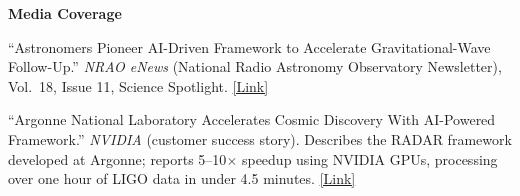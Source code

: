 \documentclass[letterpaper,11pt]{article}
\newcommand{\PubSection}[1]{%
  \vspace{6pt}\noindent\textbf{#1}\vspace{3pt}%
}
\begin{document}
\PubSection{Media Coverage}
\begin{enumerate}[leftmargin=1cm, label={[\arabic*]}, itemsep=3pt]
  \small
  \item ``Astronomers Pioneer AI-Driven Framework to Accelerate Gravitational-Wave Follow-Up.'' \textit{NRAO eNews} (National Radio Astronomy Observatory Newsletter), Vol.\ 18, Issue 11, Science Spotlight. \href{https://science.nrao.edu/enews/18.11/index.shtml}{[Link]}

  \item ``Argonne National Laboratory Accelerates Cosmic Discovery With AI-Powered Framework.'' \textit{NVIDIA} (customer success story). Describes the RADAR framework developed at Argonne; reports 5--10$\times$ speedup using NVIDIA GPUs, processing over one hour of LIGO data in under 4.5 minutes.  \href{https://www.nvidia.com/en-us/case-studies/argonne-ai-cosmic-discovery/}{[Link]}
\end{enumerate}
\end{document}
